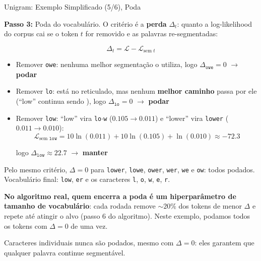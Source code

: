 \documentclass[aspectratio=169,xcolor=dvipsnames]{beamer}
\newcommand{\tok}[1]{\fcolorbox{pucrsblue}{lightblue}{\strut\textcolor{black}{\texttt{#1}}}}
\begin{document}
\begin{frame}[shrink=15]{Unigram: Exemplo Simplificado (5/6), Poda}

\textbf{Passo 3:} Poda do vocabulário. O critério é a \textbf{perda} $\Delta_t$: quanto a log-likelihood do corpus cai se o token $t$ for removido e as palavras re-segmentadas:

\vspace{-4pt}
\[
\Delta_t = \mathcal{L} - \mathcal{L}_{\text{sem } t}
\]

\begin{itemize}
    \item Remover \texttt{owe}: nenhuma melhor segmentação o utiliza, logo $\Delta_{\texttt{owe}} = 0$ $\rightarrow$ \textbf{podar}
    \item Remover \texttt{lo}: está no reticulado, mas nenhum \textbf{melhor caminho} passa por ele (``low'' continua sendo \tok{low}), logo $\Delta_{\texttt{lo}} = 0$ $\rightarrow$ \textbf{podar}
    \item Remover \texttt{low}: ``low'' vira \texttt{lo}$\cdot$\texttt{w} ($0.105 \to 0.011$) e ``lower'' vira \texttt{lower} ($0.011 \to 0.010$):
    \vspace{-2pt}
    \[
    \mathcal{L}_{\text{sem } \texttt{low}} = 10\ln(0.011) + 10\ln(0.105) + \ln(0.010) \approx -72.3
    \]
    \vspace{-14pt}

    \hspace{0.5cm}logo $\Delta_{\texttt{low}} \approx 22.7$ $\rightarrow$ \textbf{manter}
\end{itemize}

\vspace{4pt}

Pelo mesmo critério, $\Delta = 0$ para \texttt{lower}, \texttt{lowe}, \texttt{ower}, \texttt{wer}, \texttt{we} e \texttt{ow}: todos podados. Vocabulário final: \texttt{low}, \texttt{er} e os caracteres \texttt{l}, \texttt{o}, \texttt{w}, \texttt{e}, \texttt{r}.

\vspace{4pt}

\textbf{No algoritmo real, quem encerra a poda é um hiperparâmetro de tamanho de vocabulário}: cada rodada remove ${\sim}20\%$ dos tokens de menor $\Delta$ e repete até atingir o alvo (passo 6 do algoritmo). Neste exemplo, podamos todos os tokens com $\Delta = 0$ de uma vez.

\vspace{4pt}

{\footnotesize Caracteres individuais nunca são podados, mesmo com $\Delta = 0$: eles garantem que qualquer palavra continue segmentável.}

\end{frame}
\end{document}
